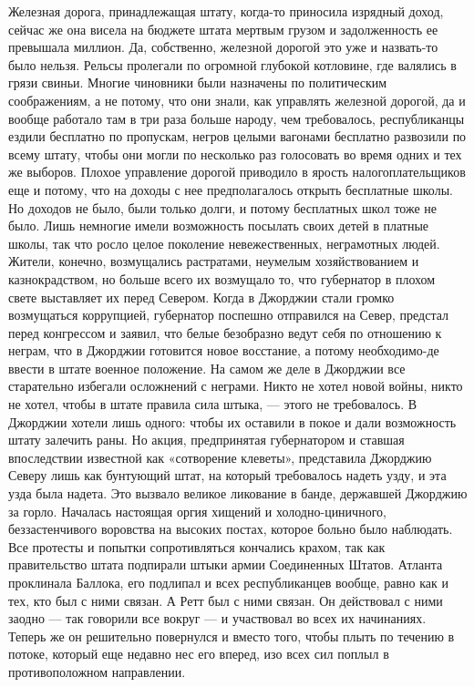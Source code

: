Железная дорога, принадлежащая штату, когда-то приносила изрядный доход, сейчас же она висела на бюджете штата мертвым грузом и задолженность ее превышала миллион. Да, собственно, железной дорогой это уже и назвать-то было нельзя. Рельсы пролегали по огромной глубокой котловине, где валялись в грязи свиньи. Многие чиновники были назначены по политическим соображениям, а не потому, что они знали, как управлять железной дорогой, да и вообще работало там в три раза больше народу, чем требовалось, республиканцы ездили бесплатно по пропускам, негров целыми вагонами бесплатно развозили по всему штату, чтобы они могли по несколько раз голосовать во время одних и тех же выборов. Плохое управление дорогой приводило в ярость налогоплательщиков еще и потому, что на доходы с нее предполагалось открыть бесплатные школы. Но доходов не было, были только долги, и потому бесплатных школ тоже не было. Лишь немногие имели возможность посылать своих детей в платные школы, так что росло целое поколение невежественных, неграмотных людей.
Жители, конечно, возмущались растратами, неумелым хозяйствованием и казнокрадством, но больше всего их возмущало то, что губернатор в плохом свете выставляет их перед Севером. Когда в Джорджии стали громко возмущаться коррупцией, губернатор поспешно отправился на Север, предстал перед конгрессом и заявил, что белые безобразно ведут себя по отношению к неграм, что в Джорджии готовится новое восстание, а потому необходимо-де ввести в штате военное положение. На самом же деле в Джорджии все старательно избегали осложнений с неграми. Никто не хотел новой войны, никто не хотел, чтобы в штате правила сила штыка, — этого не требовалось. В Джорджии хотели лишь одного: чтобы их оставили в покое и дали возможность штату залечить раны. Но акция, предпринятая губернатором и ставшая впоследствии известной как «сотворение клеветы», представила Джорджию Северу лишь как бунтующий штат, на который требовалось надеть узду, и эта узда была надета.
Это вызвало великое ликование в банде, державшей Джорджию за горло. Началась настоящая оргия хищений и холодно-циничного, беззастенчивого воровства на высоких постах, которое больно было наблюдать. Все протесты и попытки сопротивляться кончались крахом, так как правительство штата подпирали штыки армии Соединенных Штатов. Атланта проклинала Баллока, его подлипал и всех республиканцев вообще, равно как и тех, кто был с ними связан. А Ретт был с ними связан. Он действовал с ними заодно — так говорили все вокруг — и участвовал во всех их начинаниях. Теперь же он решительно повернулся и вместо того, чтобы плыть по течению в потоке, который еще недавно нес его вперед, изо всех сил поплыл в противоположном направлении.
